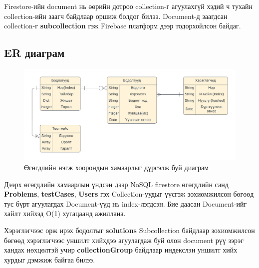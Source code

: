 Firestore-ийн document нь өөрийн дотроо collection-г агуулахгүй хэдий ч тухайн collection-ийн заагч байдлаар оршиж болдог билээ. Document-д заагдсан collection-г \textbf{subcollection} гэж Firebase платформ дээр тодорхойлсон байдаг\cite{datamodeling}.

\clearpage

\subsection{ER диаграм}
\begin{figure}[h]
  \centering
  \includegraphics[width=15cm]{img/diagrams/ERD.png}
  \caption{Өгөгдлийн нэгж хоорондын хамаарлыг дүрсэлж буй диаграм}
\end{figure}

Дээрх өгөгдлийн хамаарлын үндсэн дээр NoSQL firestore өгөгдлийн санд \textbf{Problems}, \textbf{testCases}, \textbf{Users} гэх Collection-уудыг үүсгэж зохиомжилсон бөгөөд тус бүрт агуулагдах Document-үүд нь index-лэгдсэн. Бие даасан Document-ийг хайлт хийхэд O(1) хугацаанд ажиллана. 

Хэрэглэгчээс орж ирэх бодолтыг \textbf{solutions} Subcollection байдлаар зохиомжилсон бөгөөд хэрэглэгчээс уншилт хийхдээ агуулагдаж буй олон document рүү зэрэг хандах нөхцөлтэй учир \textbf{collectionGroup}\cite{firestoreindex} байдлаар индекслэн уншилт хийх хурдыг дэмжиж байгаа билээ.